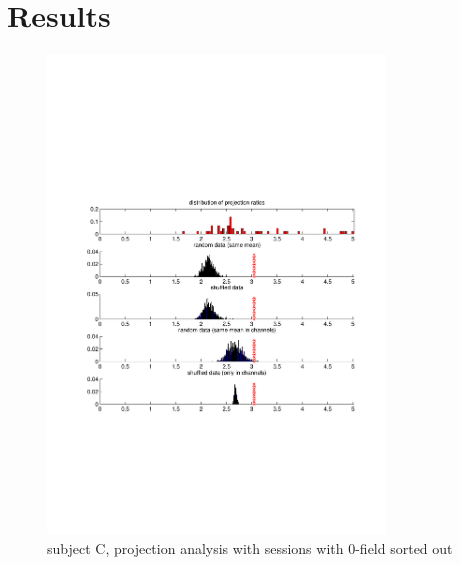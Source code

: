 \section{Results} %
\label{sg:sec:results}
\begin{figure}[ht]
    \centering
        \includegraphics[width=0.8\textwidth]{images/projection_larger0_chalva.pdf}
    \caption{subject C, projection analysis with sessions with 0-field sorted out}
    \label{sg:fig:images_projection_larger0_chalva}
\end{figure}

